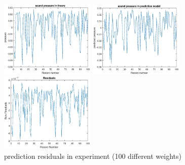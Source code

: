 \documentclass[runningheads,a4paper]{llncs}
\begin{document}
\begin{figure}[bthp]
  \begin{minipage}{0.28\linewidth}
    \centerline{\includegraphics[width=4.5cm]{Experimentwith100data_pressure.eps}}
  \end{minipage}
  \hfill
  \begin{minipage}{.28\linewidth}
    \centerline{\includegraphics[width=4.5cm]{Experimentwith100data_PressurePredicted.eps}}
  \end{minipage}
  \hfill
  \begin{minipage}{0.28\linewidth}
    \centerline{\includegraphics[width=4.5cm]{Experimentwith100data_Residuals.eps}}
  \end{minipage}
  \vfill
  \caption{prediction residuals in experiment (100 different weights)}\label{fig:250Hz}
  \label{fig:Experimentwith100data_Residuals}
\end{figure}
\end{document}
